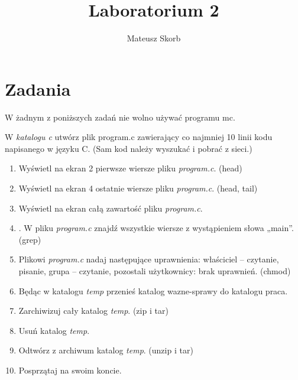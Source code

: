 \documentclass[11pt]{article} %
\title{Laboratorium 2}
\author{Mateusz Skorb}
\begin{document}
\maketitle

\section{Zadania}
W żadnym z poniższych zadań nie wolno używać programu mc.

W \textit{ katalogu c} utwórz plik program.c zawierający co najmniej 10 linii kodu napisanego w języku C. (Sam kod należy wyszukać i pobrać z sieci.)

\begin{enumerate}
\item Wyświetl na ekran 2 pierwsze wiersze pliku \textit{ program.c}. (head)
\item Wyświetl na ekran 4 ostatnie wiersze pliku  \textit{program.c}. (head, tail)
\item Wyświetl na ekran całą zawartość pliku  \textit{program.c}.
\item. W pliku  \textit{program.c} znajdź wszystkie wiersze z wystąpieniem słowa „main”. (grep)
\item Plikowi  \textit{program.c} nadaj następujące uprawnienia: właściciel – czytanie, pisanie, grupa – czytanie, pozostali użytkownicy: brak uprawnień. (chmod)
\item Będąc w katalogu  \textit{temp} przenieś katalog wazne-sprawy do katalogu praca.
\item Zarchiwizuj cały katalog  \textit{temp}. (zip i tar)
\item Usuń katalog  \textit{temp}.
\item Odtwórz z archiwum katalog  \textit{temp}. (unzip i tar)
\item Posprzątaj na swoim koncie.
  
\end{enumerate}
\end{document}
